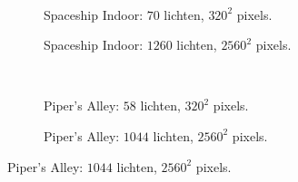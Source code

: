\begin{figure}[t]
\begin{subfigure}[b]{\textwidth}
  \end{subfigure}\hfill\\
  \begin{adjustbox}{minipage=\textwidth, scale=0.55}
    \begin{subfigure}[b]{0.8\textwidth}
      \centering
      \def\svgwidth{\textwidth}
      
      \caption{Spaceship Indoor: $70$ lichten, $320^2$ pixels.}
      \label{fig:ts-lc-frames-deferred:indoor-low}
    \end{subfigure}
  \end{adjustbox}\hspace{-0.075\textwidth}  %
  \begin{adjustbox}{minipage=\textwidth, scale=0.55}
    \begin{subfigure}[b]{0.8\textwidth}
      \centering
      \def\svgwidth{\textwidth}
      
      \caption{Spaceship Indoor: $1260$ lichten, $2560^2$ pixels.}
      \label{fig:ts-lc-frames-deferred:indoor-high}
    \end{subfigure}
  \end{adjustbox} \\
  \begin{adjustbox}{minipage=\textwidth, scale=0.55}
    \begin{subfigure}[b]{0.8\textwidth}
      \centering
      \def\svgwidth{\textwidth}
      
      \caption{Piper's Alley: $58$ lichten, $320^2$ pixels.}
      \label{fig:ts-lc-frames-deferred:alley-low}
    \end{subfigure}
  \end{adjustbox}\hspace{-0.075\textwidth}  %
  \begin{adjustbox}{minipage=\textwidth, scale=0.55}
    \begin{subfigure}[b]{0.8\textwidth}
      \centering
      \def\svgwidth{\textwidth}
      
      \caption{Piper's Alley: $1044$ lichten, $2560^2$ pixels.}

\end{subfigure}
\end{adjustbox}
\end{figure}
